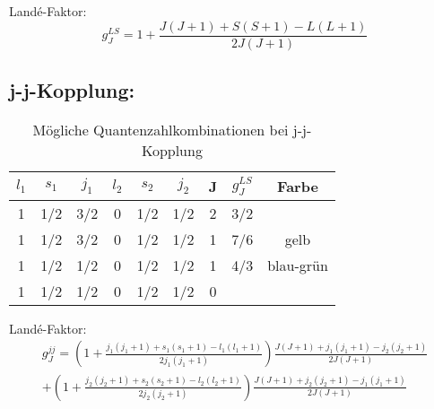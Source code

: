 \documentclass[a4paper,parskip,11pt, DIV12]{scrreprt}
\begin{document}
	Landé-Faktor:
			\begin{equation}
			\label{eq:gLS}
		g_J^{LS} = 1+\frac{J(J+1)+S(S+1)-L(L+1)}{2J(J+1)}
		\end{equation}
	
	\subsection*{j-j-Kopplung:}
	
\begin{table}[H]
	\centering
	\begin{tabular}{|c|c|c|c|c|c|c|c|c|}
	\hline 
$l_1$ & $s_1$ & $j_1$ & $l_2$ & $s_2$ & $j_2$ & J & $g_J^{LS}$ & Farbe	\\
\hline \hline
1 & 1/2 & 3/2 & 0 & 1/2 & 1/2 & 2 & 3/2 &	\\
\hline
1 & 1/2 & 3/2 & 0 & 1/2 & 1/2 & 1 & 7/6 & gelb	\\
\hline
1 & 1/2 & 1/2 & 0 & 1/2 & 1/2 & 1 & 4/3 & blau-grün	\\
\hline
1 & 1/2 & 1/2 & 0 & 1/2 & 1/2 & 0 &  &	\\
\hline
	\end{tabular} 
	\caption{Mögliche Quantenzahlkombinationen bei j-j-Kopplung}
	\end{table}		
	
	Landé-Faktor:
			\begin{equation}
			\label{eq:gjj}
		\begin{split} g_J^{jj} = (1+\frac{j_1(j_1+1)+s_1(s_1+1)-l_1(l_1+1)}{2j_1(j_1+1)}) \frac{J(J+1)+j_1(j_1+1)-j_2(j_2+1)}{2J(J+1)} \\ + (1+\frac{j_2(j_2+1)+s_2(s_2+1)-l_2(l_2+1)}{2j_2(j_2+1)}) \frac{J(J+1)+j_2(j_2+1)-j_1(j_1+1)}{2J(J+1)}
		\end{split}
		\end{equation}
\end{document}
